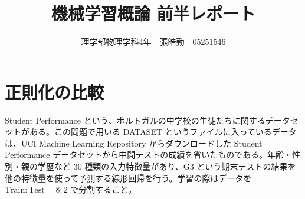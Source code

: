 \documentclass[11pt,a4paper,dvipdfmx]{article}
\numberwithin{equation}{section}
\newenvironment{note}[0]
{
    \begin{tcolorbox}[sharp corners, colframe=gray!20, colback=gray!20, width=\textwidth]
}
{
    \end{tcolorbox}
}
\begin{document}
\title{機械学習概論 前半レポート}
\author{理学部物理学科4年　張皓勤　05251546}
\date{}
\maketitle


\section{正則化の比較}
\begin{note}
Student Performance という、ポルトガルの中学校の生徒たちに関するデータセットがある。この問題で用いる DATASET というファイルに入っているデータは、UCI Machine Learning Repository からダウンロードした Student Performance データセットから中間テストの成績を省いたものである。年齢・性別・親の学歴など 30 種類の入力特徴量があり、G3 という期末テストの結果を他の特徴量を使って予測する線形回帰を行う。学習の際はデータを $\text{Train}:\text{Test}= 8 : 2$ で分割すること。
\end{note}
\end{document}
